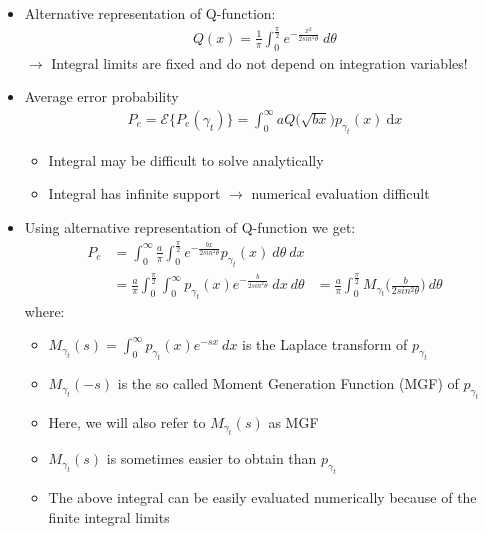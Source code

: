 \documentclass[a4paper, 10pt]{article}
\begin{document}
\begin{itemize}
	\item Alternative representation of Q\;-\;function:
			\begin{align*} 
			Q(x) = \frac{1}{\pi}\int_{0}^{\frac{\pi}{2}} e^{-\frac{x^2}{2sin^2\theta}}~d\theta
			\end{align*}
			$\rightarrow$ Integral limits are fixed and do not depend on integration variables!
	\item Average error probability
		\begin{align*} 
		P_e = \mathcal{E}\bigl \{P_e(\gamma_t)\bigr \} = \int_{0}^{\infty}aQ\bigr (\sqrt{bx}\bigl )p_{\gamma_t}(x)~\mathrm{d}x
		\end{align*}
		\begin{itemize}
			\item Integral may be difficult to solve analytically
			\item Integral has infinite support $\rightarrow$ numerical evaluation difficult
		\end{itemize}
	\item Using alternative representation of Q-function we get:
		\begin{align*}
			P_e &= \int_{0}^{\infty}\frac{a}{\pi}\int_{0}^{\frac{\pi}{2}}e^{-\frac{bx}{2sin^2\theta}}p_{\gamma_t}(x)~d\theta ~dx\\
			&= \frac{a}{\pi}\int_{0}^{\frac{\pi}{2}}\int_{0}^{\infty}p_{\gamma_t}(x)e^{-\frac{b}{2sin^2\theta}}~dx~d\theta &= \frac{a}{\pi}\int_{0}^{\frac{\pi}{2}}M_{\gamma_t}\bigl ( \frac{b}{2sin^2\theta} \bigr )~d\theta
		\end{align*}
where:
		\begin{itemize}
				\item $M_{\gamma_t}(s) = \int_{0}^{\infty}p_{\gamma_t}(x)e^{-sx}~dx$ is the Laplace transform of $p_{\gamma_t}$	
				\item $M_{\gamma_t}(-s)$ is the so called Moment Generation Function (MGF) of $p_{\gamma_t}$
				\item Here, we will also refer to $M_{\gamma_t}(s)$ as MGF
				\item $M_{\gamma_t}(s)$ is sometimes easier to obtain than $p_{\gamma_t}$
				\item The above integral can be easily evaluated numerically because of the finite integral limits
			\end{itemize}
\end{itemize}
\end{document}

